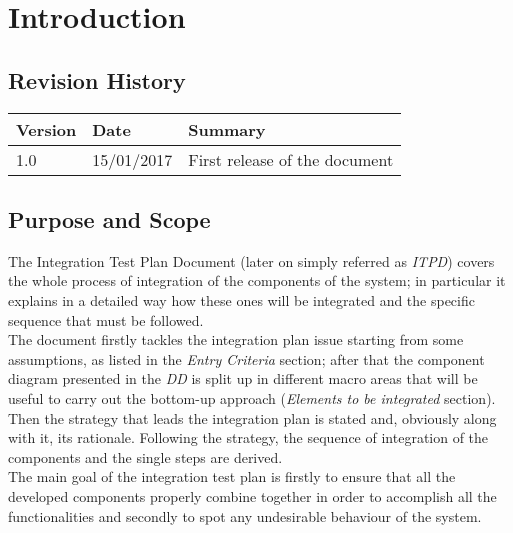 \documentclass[11pt,a4paper]{report}
\begin{document}


\thispagestyle{empty}
\tableofcontents
\listoffigures
\cleardoublepage
{}
\pagestyle{fancy}

\chapter{Introduction}
\section{Revision History}
\begin{tabularx}{\textwidth}{|l|l|X|}
	\hline
	Version & Date & Summary\\
	\hline
	1.0 & 15/01/2017 & First release of the document\\
	\hline
\end{tabularx}

\section{Purpose and Scope}
The Integration Test Plan Document (later on simply referred as \textit{ITPD}) covers the whole process of integration of the components of the system; in particular it explains in a detailed way how these ones will be integrated and the specific sequence that must be followed.\\
The document firstly tackles the integration plan issue starting from some assumptions, as listed in the \textit{Entry Criteria} section; after that the component diagram presented in the \textit{DD} is split up in different macro areas that will be useful to carry out the bottom-up approach (\textit{Elements to be integrated} section).\\
Then the strategy that leads the integration plan is stated and, obviously along with it, its rationale. Following the strategy, the sequence of integration of the components and the single steps are derived.\\
The main goal of the integration test plan is firstly to ensure that all the developed components properly combine together in order to accomplish all the functionalities and secondly to spot any undesirable behaviour of the system.
\end{document}
